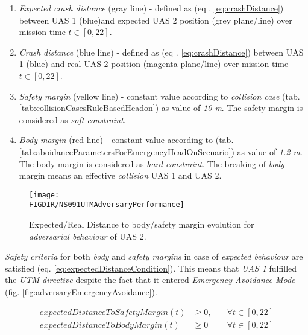 \begin{enumerate}
    \item \emph{Expected crash distance} (gray line) - defined  as (eq . \ref{eq:crashDistance}) between UAS 1  (blue)and expected UAS 2 position (grey plane/line) over mission time $t\in[0,22]$.
    
    \item \emph{Crash distance} (blue line) - defined  as (eq . \ref{eq:crashDistance}) between UAS 1 (blue) and real UAS 2 position (magenta plane/line) over mission time $t\in[0,22]$.
    
    \item \emph{Safety margin} (yellow line) - constant value according to \emph{collision case}  (tab. \ref{tab:collisionCasesRuleBasedHeadon}) as value of \emph{10 m}. The safety margin is considered as \emph{soft constraint}.
    
    \item \emph{Body margin} (red line) - constant value according to (tab. \ref{tab:aboidanceParametersForEmergencyHeadOnScenario}) as value of  \emph{1.2 m}. The body margin is considered as \emph{hard constraint}. The breaking of \emph{body} margin means an effective \emph{collision} UAS 1 and UAS 2.
\end{enumerate}

\begin{figure}[H]
    \centering
    \texttt{[image: \\FIGDIR/NS091UTMAdversaryPerformance]} 
    \caption{Expected/Real Distance to body/safety margin evolution for \emph{adversarial behaviour} of UAS 2.}
    \label{fig:adversaryDistanceToSafetyMargins}
\end{figure}

\noindent\emph{Safety criteria} for both \emph{body} and \emph{safety margins} in case of \emph{expected behaviour} are satisfied (eq. \ref{eq:expectedDistanceCondition}). This means that \emph{UAS 1} fulfilled the \emph{UTM directive} despite the fact that it entered \emph{Emergency Avoidance Mode} (fig. \ref{fig:adversaryEmergencyAvoidance}).

\begin{equation}\label{eq:expectedDistanceCondition}
    \begin{aligned}
    expectedDistanceToSafetyMargin(t) &\ge 0,\quad &\forall t \in [0,22]\\
    expectedDistanceToBodyMargin(t)  &\ge 0 \quad &\forall t \in [0,22]
    \end{aligned}
\end{equation}

